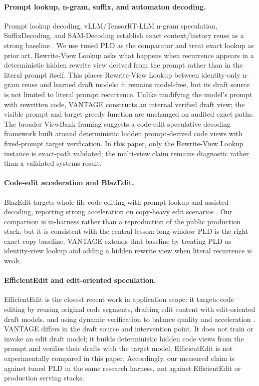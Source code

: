 \documentclass[11pt,a4paper]{article}
\begin{document}
\paragraph{Prompt lookup, n-gram, suffix, and automaton decoding.}
Prompt lookup decoding, vLLM/TensorRT-LLM n-gram speculation,
SuffixDecoding, and SAM-Decoding establish exact context/history reuse as a
strong baseline
\cite{promptlookup,hfpld,vllmngram,tensorrtngram,suffixdecoding,samdecoding}. We
use tuned PLD as the comparator and treat exact lookup as prior art.
Rewrite-View Lookup asks what happens when recurrence appears in a deterministic hidden
rewrite view derived from the prompt rather than in the literal prompt itself.
This places Rewrite-View Lookup between identity-only n-gram reuse and learned
draft models: it remains model-free, but its draft source is not limited to
literal prompt recurrence.
Unlike modifying the model's prompt with rewritten code, VANTAGE constructs an
internal verified draft view; the visible prompt and target greedy function are
unchanged on audited exact paths.
The broader ViewBank framing suggests a code-edit speculative decoding
framework built around deterministic hidden prompt-derived code views with
fixed-prompt target verification. In this paper, only the Rewrite-View Lookup instance
is exact-path validated; the multi-view claim remains diagnostic rather than a
validated systems result.

\paragraph{Code-edit acceleration and BlazEdit.}
BlazEdit targets whole-file code editing with prompt lookup and assisted
decoding, reporting strong acceleration on copy-heavy edit scenarios
\cite{blazedit}. Our comparison is in-harness rather than a reproduction
of the public production stack, but it is consistent with the central lesson:
long-window PLD is the right exact-copy baseline. VANTAGE extends that
baseline by treating PLD as identity-view lookup and adding a hidden rewrite
view when literal recurrence is weak.

\paragraph{EfficientEdit and edit-oriented speculation.}
EfficientEdit is the closest recent work in application scope: it targets
code editing by reusing original code segments, drafting edit content with
edit-oriented draft models, and using dynamic verification to balance
quality and acceleration \cite{efficientedit}. VANTAGE differs in the draft
source and intervention point. It does not train or invoke an edit draft model;
it builds deterministic hidden code views from the prompt and verifies their
drafts with the target model. EfficientEdit is not experimentally compared in this paper.
Accordingly, our measured claim is against tuned PLD in the same research
harness, not against EfficientEdit or production serving stacks.
\end{document}
